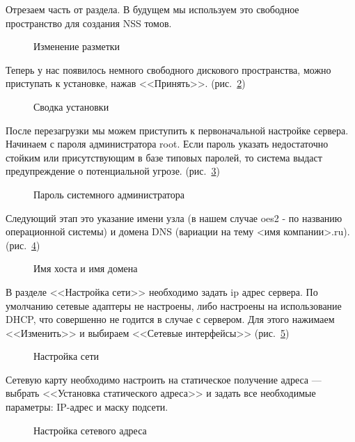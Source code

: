 Отрезаем часть от раздела. В будущем мы используем это свободное пространство для создания NSS томов.
\begin{figure}[H]
\caption{Изменение разметки}
\label{p4}
\end{figure}
\clearpage

Теперь у нас появилось немного свободного дискового пространства, можно приступать к установке, нажав <<Принять>>. (рис.~\ref{p5})
\begin{figure}[H]
\caption{Сводка установки}
\label{p5}
\end{figure}
\clearpage

После перезагрузки мы можем приступить к первоначальной настройке сервера.\\
Начинаем с пароля администратора root. Если пароль указать недостаточно стойким или присутствующим в базе типовых паролей, то система выдаст предупреждение о потенциальной угрозе. (рис.~\ref{fig6})
\begin{figure}[H]
\caption{Пароль системного администратора}
\label{fig6}
\end{figure}
\clearpage

Следующий этап это указание имени узла (в нашем случае oes2 - по названию операционной системы) и домена DNS (вариации на тему <имя компании>.ru). (рис.~\ref{fig7})
\begin{figure}[H]
\caption{Имя хоста и имя домена}
\label{fig7}
\end{figure}
\clearpage

В разделе <<Настройка сети>> необходимо задать ip адрес сервера. По умолчанию сетевые адаптеры не настроены, либо настроены на использование DHCP, что совершенно не годится в случае с сервером. Для этого нажимаем <<Изменить>> и выбираем <<Сетевые интерфейсы>> (рис.~\ref{figNetworkall})
\begin{figure}[H]
\caption{Настройка сети}
\label{figNetworkall}
\end{figure}
\clearpage

Сетевую карту необходимо настроить на статическое получение адреса — выбрать <<Установка статического адреса>> и задать все необходимые параметры: IP-адрес и маску подсети.
\begin{figure}[H]
\caption{Настройка сетевого адреса}
\label{fig8}
\end{figure}
\clearpage

